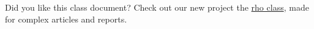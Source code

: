 \documentclass[9pt,a4paper,twoside]{tau-class/tau}
\begin{document}
    \noindent Did you like this class document? Check out our new project the \href{https://es.overleaf.com/latex/templates/rho-class-academic-article-template/bpgjxjjqhtfy}{rho class}, made for complex articles and reports.
    

\printbibliography

\end{document}
